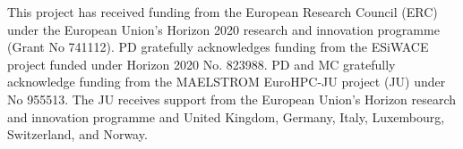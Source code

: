 \documentclass[hess, twostagejnl]{copernicus}
\providecommand{\DIFadd}[1]{{\protect\color{blue} \sf #1}} %
\providecommand{\DIFaddbegin}{} %
\providecommand{\DIFaddend}{} %
\begin{document}








\DIFaddbegin {} %


\DIFaddend %

\DIFaddbegin \begin{acknowledgements}
\DIFadd{This project has received funding from the European Research Council (ERC) under the European Union’s Horizon 2020 research and innovation programme (Grant No 741112). PD gratefully acknowledges funding from the ESiWACE project funded under Horizon 2020 No. 823988. PD and MC gratefully acknowledge funding from the MAELSTROM EuroHPC-JU project (JU) under No 955513. The JU receives support from the European Union’s Horizon research and innovation programme and United Kingdom, Germany, Italy, Luxembourg, Switzerland, and Norway.

}

\end{acknowledgements}




\DIFaddend %
\end{document}
